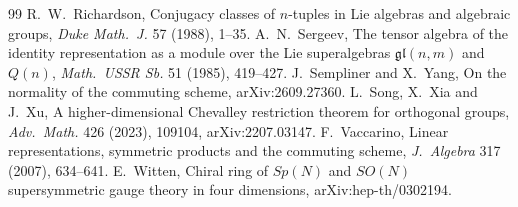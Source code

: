 \documentclass[11pt]{article}
\theoremstyle{definition}
\begin{document}
\begin{thebibliography}{99}
 R.~W.~Richardson, Conjugacy classes of $n$-tuples in Lie algebras and algebraic groups, \emph{Duke Math.\ J.} 57 (1988), 1--35.
 A.~N.~Sergeev, The tensor algebra of the identity representation as a module over the Lie superalgebras $\mathfrak{gl}(n,m)$ and $Q(n)$, \emph{Math.\ USSR Sb.} 51 (1985), 419--427.
 J.~Sempliner and X.~Yang, On the normality of the commuting scheme, arXiv:2609.27360.
 L.~Song, X.~Xia and J.~Xu, A higher-dimensional Chevalley restriction theorem for orthogonal groups, \emph{Adv.\ Math.} 426 (2023), 109104, arXiv:2207.03147.
 F.~Vaccarino, Linear representations, symmetric products and the commuting scheme, \emph{J.\ Algebra} 317 (2007), 634--641.
 E.~Witten, Chiral ring of $Sp(N)$ and $SO(N)$ supersymmetric gauge theory in four dimensions, arXiv:hep-th/0302194.
\end{thebibliography}
\end{document}
